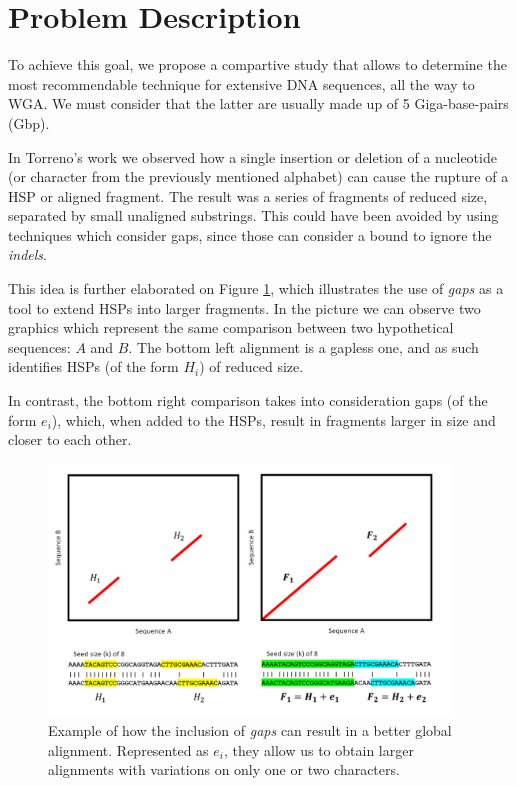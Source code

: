 \section{Problem Description}

To achieve this goal, we propose a compartive study that allows to determine the most recommendable technique for extensive DNA sequences, all the way to WGA. We must consider that the latter are usually made up of 5 Giga-base-pairs (Gbp).

\medskip

In Torreno's work \cite{Tirado2015BreakingTC} we observed how a single insertion or deletion of a nucleotide (or character from the previously mentioned alphabet) can cause the rupture of a HSP or aligned fragment. The result was a series of fragments of reduced size, separated by small unaligned substrings. This could have been avoided by using techniques which consider gaps, since those can consider a bound to ignore the \textit{indels}.

\medskip

This idea is further elaborated on Figure \ref{fragmentImprovement}, which illustrates the use of \textit{gaps} as a tool to extend HSPs into larger fragments. In the picture we can observe two graphics which represent the same comparison between two hypothetical sequences: $A$ and $B$. The bottom left alignment is a gapless one, and as such identifies HSPs (of the form $H_i$) of reduced size. 

\medskip

In contrast, the bottom right comparison takes into consideration gaps (of the form $e_i$), which, when added to the HSPs, result in fragments larger in size and closer to each other. 

\begin{figure}
  \centering
  \includegraphics[width=0.95\textwidth]{images/fragmentImprovement.png}
  \caption[]{Example of how the inclusion of \textit{gaps} can result in a better global alignment. Represented as $e_i$, they allow us to obtain larger alignments with variations on only one or two characters.}
  \label{fragmentImprovement}
\end{figure}

